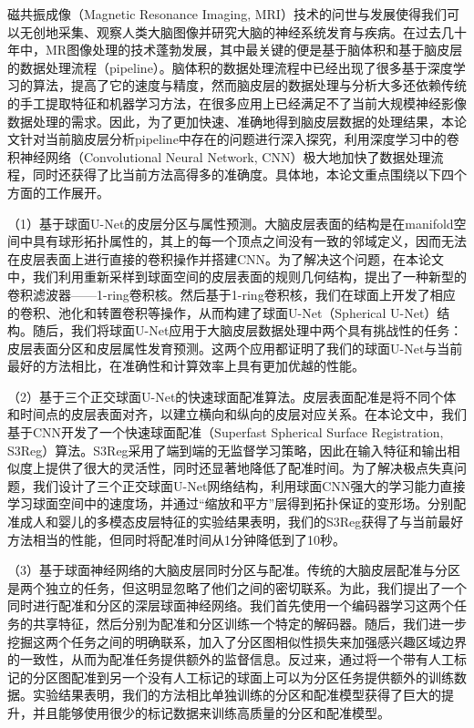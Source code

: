 \cleardoublepage
{}
磁共振成像（Magnetic Resonance Imaging, MRI）技术的问世与发展使得我们可以无创地采集、观察人类大脑图像并研究大脑的神经系统发育与疾病。在过去几十年中，MR图像处理的技术蓬勃发展，其中最关键的便是基于脑体积和基于脑皮层的数据处理流程（pipeline）。脑体积的数据处理流程中已经出现了很多基于深度学习的算法，提高了它的速度与精度，然而脑皮层的数据处理与分析大多还依赖传统的手工提取特征和机器学习方法，在很多应用上已经满足不了当前大规模神经影像数据处理的需求。因此，为了更加快速、准确地得到脑皮层数据的处理结果，本论文针对当前脑皮层分析pipeline中存在的问题进行深入探究，利用深度学习中的卷积神经网络（Convolutional Neural Network, CNN）极大地加快了数据处理流程，同时还获得了比当前方法高得多的准确度。具体地，本论文重点围绕以下四个方面的工作展开。

（1）基于球面U-Net的皮层分区与属性预测。大脑皮层表面的结构是在manifold空间中具有球形拓扑属性的，其上的每一个顶点之间没有一致的邻域定义，因而无法在皮层表面上进行直接的卷积操作并搭建CNN。为了解决这个问题，在本论文中，我们利用重新采样到球面空间的皮层表面的规则几何结构，提出了一种新型的卷积滤波器——1-ring卷积核。然后基于1-ring卷积核，我们在球面上开发了相应的卷积、池化和转置卷积等操作，从而构建了球面U-Net（Spherical U-Net）结构。随后，我们将球面U-Net应用于大脑皮层数据处理中两个具有挑战性的任务：皮层表面分区和皮层属性发育预测。这两个应用都证明了我们的球面U-Net与当前最好的方法相比，在准确性和计算效率上具有更加优越的性能。

（2）基于三个正交球面U-Net的快速球面配准算法。皮层表面配准是将不同个体和时间点的皮层表面对齐，以建立横向和纵向的皮层对应关系。在本论文中，我们基于CNN开发了一个快速球面配准（Superfast Spherical Surface Registration, S3Reg）算法。S3Reg采用了端到端的无监督学习策略，因此在输入特征和输出相似度上提供了很大的灵活性，同时还显著地降低了配准时间。为了解决极点失真问题，我们设计了三个正交球面U-Net网络结构，利用球面CNN强大的学习能力直接学习球面空间中的速度场，并通过“缩放和平方”层得到拓扑保证的变形场。分别配准成人和婴儿的多模态皮层特征的实验结果表明，我们的S3Reg获得了与当前最好方法相当的性能，但同时将配准时间从1分钟降低到了10秒。	

（3）基于球面神经网络的大脑皮层同时分区与配准。传统的大脑皮层配准与分区是两个独立的任务，但这明显忽略了他们之间的密切联系。为此，我们提出了一个同时进行配准和分区的深层球面神经网络。我们首先使用一个编码器学习这两个任务的共享特征，然后分别为配准和分区训练一个特定的解码器。随后，我们进一步挖掘这两个任务之间的明确联系，加入了分区图相似性损失来加强感兴趣区域边界的一致性，从而为配准任务提供额外的监督信息。反过来，通过将一个带有人工标记的分区图配准到另一个没有人工标记的球面上可以为分区任务提供额外的训练数据。实验结果表明，我们的方法相比单独训练的分区和配准模型获得了巨大的提升，并且能够使用很少的标记数据来训练高质量的分区和配准模型。

